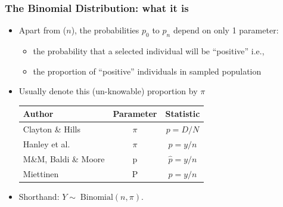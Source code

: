 \documentclass{beamer}\usepackage[]{graphicx}\usepackage[]{color}
\begin{document}
\begin{frame}
\frametitle{The Binomial Distribution: what it is}
\begin{itemize}
		\setlength\itemsep{0.5em}
	\item Apart from  ($n$), the probabilities $p_{0}$ to $p_{n}$ depend on only 1 parameter:
	\begin{itemize}
		\item the probability that a selected individual will be ``positive''  i.e.,
		\item the proportion of ``positive'' individuals in sampled population
	\end{itemize}

	\item Usually denote this (un-knowable) proportion by $\pi$
	
	\begin{tabular}{lcc}
		\hline
		Author & \textbf{Parameter} & \textbf{Statistic} \\
		\hline
		Clayton \& Hills   & $\pi $ & $p= D/N$ \\
		Hanley et al. & $\pi $ & $p= y/n$ \\
		M\&M, Baldi \& Moore & p &$\hat{p} = y/n$ \\
		Miettinen& P & $p=y/n$ \\
		\hline
	\end{tabular}
	\item
	Shorthand:  $Y\sim\; \textrm{Binomial}(n, \pi)$.
\end{itemize}
\end{frame}


\end{document}

